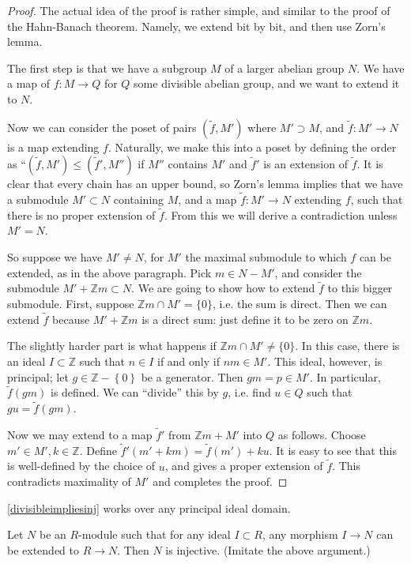 \begin{proof}
The actual idea of the proof is rather simple, and similar to the proof
of the Hahn-Banach theorem.
Namely, we extend bit by bit, and then use Zorn's lemma.

The first step is that we have a subgroup $M $ of a larger abelian
group $N$.
We have a map of $f:M \to Q$ for $Q$ some divisible abelian group, and we
want to extend it to $N$.

Now we can consider the poset of pairs $(\tilde{f}, M')$ where $M' \supset
  M$, and $\tilde{f}: M' \to N$ is a map extending $f$.
  Naturally, we make this into a poset by defining the order as ``$(\tilde{f},
  M') \leq (\tilde{f}', M'')$ if $M'' $ contains $M'$ and $\tilde{f}'$
 is an extension of $\tilde{f}$.
  It is clear that every chain has an upper bound, so Zorn's lemma implies
  that we have a submodule $M' \subset N$ containing $M$, and a map $\tilde{f}: M'
  \to N$ extending $f$, such that there is no proper extension of $\tilde{f}$.
  From this we will derive a contradiction unless $M' = N$.

So suppose we have $M' \neq N$, for $M'$ the maximal submodule to which $f$
can be extended, as in the above paragraph.  Pick $m \in N - M'$, and consider the
submodule $M' + \mathbb{Z} m \subset N$.  We are going to show how to extend $\tilde{f}$
to this bigger submodule.  First, suppose $\mathbb{Z}m \cap M' = \{0\}$,
i.e. the sum is direct.  Then we can extend $\tilde{f}$ because $M' +
\mathbb{Z}m$ is a
direct sum: just define it to be zero on $\mathbb{Z}m$.

The slightly harder part is what happens if $\mathbb{Z} m \cap M' \neq \{ 0\}$.
In this case, there is an ideal $I \subset \mathbb{Z}$ such that $n \in I$
if and only if $nm \in M'$.
This ideal, however, is principal; let $g \in \mathbb{Z} - \left\{0\right\}$ be a generator.  Then $gm = p
\in M'$.  In particular, $\tilde{f}(gm)$ is defined.
We can ``divide'' this
by $g$, i.e. find $u \in Q$ such that $gu = \tilde{f}(gm)$. 

Now we may extend to a
map $\tilde{f}'$ from $\mathbb{Z} m + M'$ into $Q$ as follows.  Choose $m'
\in M', k \in \mathbb{Z}$.  Define $\tilde{f}'( m' + km) = \tilde{f}(m')
+ k u$.  It is easy to see that this is well-defined by the choice of $u$,
and gives a proper extension of $\tilde{f}$. This contradicts maximality of
$M'$ and completes the proof.
\end{proof}

\begin{exercise} 
\cref{divisibleimpliesinj} works over any principal ideal domain.
\end{exercise} 
\begin{exercise}[Baer] \label{baercriterion}
Let $N$ be an $R$-module such that for any ideal $I \subset R$, any morphism
$I \to N$ can be extended to $R \to N$. Then $N$ is injective. (Imitate the
above argument.)
\end{exercise} 


